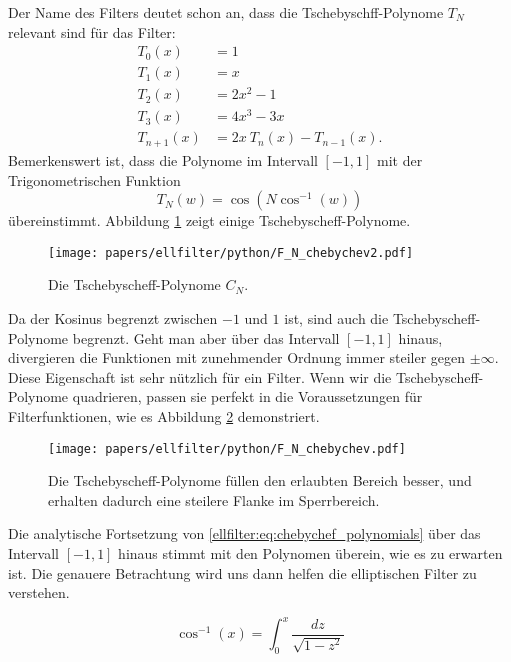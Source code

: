 \begin{refsection}
Der Name des Filters deutet schon an, dass die Tschebyschff-Polynome $T_N$ relevant sind für das Filter:
\begin{align}
    T_{0}(x)&=1\\
    T_{1}(x)&=x\\
    T_{2}(x)&=2x^{2}-1\\
    T_{3}(x)&=4x^{3}-3x\\
    T_{n+1}(x)&=2x~T_{n}(x)-T_{n-1}(x).
\end{align}
Bemerkenswert ist, dass die Polynome im Intervall $[-1, 1]$ mit der Trigonometrischen Funktion
\begin{equation} \label{ellfilter:eq:chebychef_polynomials}
    T_N(w) = \cos \left( N \cos^{-1}(w) \right)
\end{equation}
übereinstimmt.
Abbildung \ref{ellfilter:fig:chebychef_polynomials} zeigt einige Tschebyscheff-Polynome.
\begin{figure}
    \centering
    \texttt{[image: papers/ellfilter/python/F\_N\_chebychev2.pdf]}
    \caption{Die Tschebyscheff-Polynome $C_N$.}
    \label{ellfilter:fig:chebychef_polynomials}
\end{figure}
Da der Kosinus begrenzt zwischen $-1$ und $1$ ist, sind auch die Tschebyscheff-Polynome begrenzt.
Geht man aber über das Intervall $[-1, 1]$ hinaus, divergieren die Funktionen mit zunehmender Ordnung immer steiler gegen $\pm \infty$.
Diese Eigenschaft ist sehr nützlich für ein Filter.
Wenn wir die Tschebyscheff-Polynome quadrieren, passen sie perfekt in die Voraussetzungen für Filterfunktionen, wie es Abbildung \ref{ellfiter:fig:chebychef} demonstriert.
\begin{figure}
    \centering
    \texttt{[image: papers/ellfilter/python/F\_N\_chebychev.pdf]}
    \caption{Die Tschebyscheff-Polynome füllen den erlaubten Bereich besser, und erhalten dadurch eine steilere Flanke im Sperrbereich.}
    \label{ellfiter:fig:chebychef}
\end{figure}


Die analytische Fortsetzung von \eqref{ellfilter:eq:chebychef_polynomials} über das Intervall $[-1,1]$ hinaus stimmt mit den Polynomen überein, wie es zu erwarten ist.
Die genauere Betrachtung wird uns dann helfen die elliptischen Filter zu verstehen.

\begin{equation}
    \cos^{-1}(x)
    =
    \int_{0}^{x}
    \frac{
        dz
    }{
        \sqrt{
            1-z^2
        }
    }
\end{equation} %


\end{refsection}
